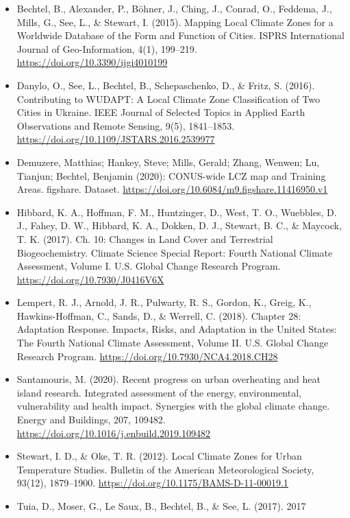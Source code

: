 \documentclass[
]{article}
\providecommand{\tightlist}{%
  \setlength{\itemsep}{0pt}\setlength{\parskip}{0pt}}
\begin{document}
\begin{itemize}
\tightlist
\item
  Bechtel, B., Alexander, P., Böhner, J., Ching, J., Conrad, O.,
  Feddema, J., Mills, G., See, L., \& Stewart, I. (2015). Mapping Local
  Climate Zones for a Worldwide Database of the Form and Function of
  Cities. ISPRS International Journal of Geo-Information, 4(1),
  199--219. \url{https://doi.org/10.3390/ijgi4010199}
\item
  Danylo, O., See, L., Bechtel, B., Schepaschenko, D., \& Fritz, S.
  (2016). Contributing to WUDAPT: A Local Climate Zone Classification of
  Two Cities in Ukraine. IEEE Journal of Selected Topics in Applied
  Earth Observations and Remote Sensing, 9(5), 1841--1853.
  \url{https://doi.org/10.1109/JSTARS.2016.2539977}
\item
  Demuzere, Matthias; Hankey, Steve; Mills, Gerald; Zhang, Wenwen; Lu,
  Tianjun; Bechtel, Benjamin (2020): CONUS-wide LCZ map and Training
  Areas. figshare. Dataset.
  \url{https://doi.org/10.6084/m9.figshare.11416950.v1}
\item
  Hibbard, K. A., Hoffman, F. M., Huntzinger, D., West, T. O., Wuebbles,
  D. J., Fahey, D. W., Hibbard, K. A., Dokken, D. J., Stewart, B. C., \&
  Maycock, T. K. (2017). Ch. 10: Changes in Land Cover and Terrestrial
  Biogeochemistry. Climate Science Special Report: Fourth National
  Climate Assessment, Volume I. U.S. Global Change Research Program.
  \url{https://doi.org/10.7930/J0416V6X}
\item
  Lempert, R. J., Arnold, J. R., Pulwarty, R. S., Gordon, K., Greig, K.,
  Hawkins-Hoffman, C., Sands, D., \& Werrell, C. (2018). Chapter 28:
  Adaptation Response. Impacts, Risks, and Adaptation in the United
  States: The Fourth National Climate Assessment, Volume II. U.S. Global
  Change Research Program. \url{https://doi.org/10.7930/NCA4.2018.CH28}
\item
  Santamouris, M. (2020). Recent progress on urban overheating and heat
  island research. Integrated assessment of the energy, environmental,
  vulnerability and health impact. Synergies with the global climate
  change. Energy and Buildings, 207, 109482.
  \url{https://doi.org/10.1016/j.enbuild.2019.109482}
\item
  Stewart, I. D., \& Oke, T. R. (2012). Local Climate Zones for Urban
  Temperature Studies. Bulletin of the American Meteorological Society,
  93(12), 1879--1900. \url{https://doi.org/10.1175/BAMS-D-11-00019.1}
\item
  Tuia, D., Moser, G., Le Saux, B., Bechtel, B., \& See, L. (2017). 2017

\end{itemize}
\end{document}
